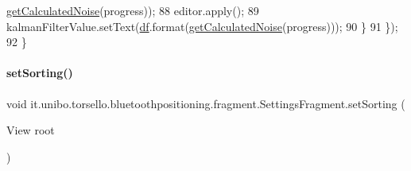 \begin{DoxyCode}
      \hyperlink{classit_1_1unibo_1_1torsello_1_1bluetoothpositioning_1_1fragment_1_1SettingsFragment_a595d859602f34ca81957a0578c1602a6_a595d859602f34ca81957a0578c1602a6}{getCalculatedNoise}(progress));
88                 editor.apply();
89                 kalmanFilterValue.setText(\hyperlink{classit_1_1unibo_1_1torsello_1_1bluetoothpositioning_1_1fragment_1_1SettingsFragment_af6b80a700dc80c39a56d001b68a47694_af6b80a700dc80c39a56d001b68a47694}{df}.format(\hyperlink{classit_1_1unibo_1_1torsello_1_1bluetoothpositioning_1_1fragment_1_1SettingsFragment_a595d859602f34ca81957a0578c1602a6_a595d859602f34ca81957a0578c1602a6}{getCalculatedNoise}(progress)));
90             \}
91         \});
92     \}
\end{DoxyCode}
\hypertarget{classit_1_1unibo_1_1torsello_1_1bluetoothpositioning_1_1fragment_1_1SettingsFragment_ae29f0b3d6fc60f1ceeab5dcc530166c1_ae29f0b3d6fc60f1ceeab5dcc530166c1}{}\label{classit_1_1unibo_1_1torsello_1_1bluetoothpositioning_1_1fragment_1_1SettingsFragment_ae29f0b3d6fc60f1ceeab5dcc530166c1_ae29f0b3d6fc60f1ceeab5dcc530166c1} 
\paragraph{\texorpdfstring{set\+Sorting()}{setSorting()}}
{\footnotesize\ttfamily void it.\+unibo.\+torsello.\+bluetoothpositioning.\+fragment.\+Settings\+Fragment.\+set\+Sorting (\begin{DoxyParamCaption}\item[{View}]{root }\end{DoxyParamCaption})\hspace{0.3cm}{\ttfamily [private]}}


